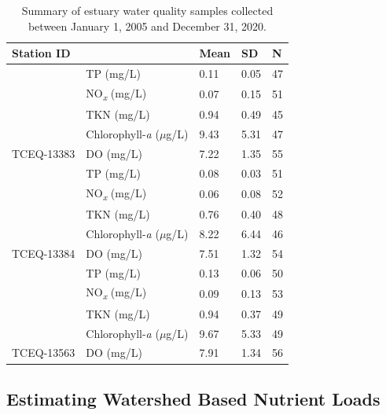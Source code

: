 \documentclass[water,article,submit,oneauthor]{Definitions/mdpi}
\begin{document}
\begin{table}[H]

\caption{\label{tab:estuarysummary}Summary of estuary water quality samples collected between January 1, 2005 and December 31, 2020.}
\centering
\begin{tabular}[t]{lllll}
\toprule
Station ID &   & Mean & SD & N\\
\midrule
 & TP (mg/L) & 0.11 & 0.05 & 47\\

 & NO\textsubscript{\emph{x}} (mg/L) & 0.07 & 0.15 & 51\\

 & TKN (mg/L) & 0.94 & 0.49 & 45\\

 & Chlorophyll-\emph{a} ($\mu$g/L) & 9.43 & 5.31 & 47\\

\multirow{-5}{*}{\raggedright\arraybackslash TCEQ-13383} & DO (mg/L) & 7.22 & 1.35 & 55\\
\cmidrule{1-5}
 & TP (mg/L) & 0.08 & 0.03 & 51\\

 & NO\textsubscript{\emph{x}} (mg/L) & 0.06 & 0.08 & 52\\

 & TKN (mg/L) & 0.76 & 0.40 & 48\\

 & Chlorophyll-\emph{a} ($\mu$g/L) & 8.22 & 6.44 & 46\\

\multirow{-5}{*}{\raggedright\arraybackslash TCEQ-13384} & DO (mg/L) & 7.51 & 1.32 & 54\\
\cmidrule{1-5}
 & TP (mg/L) & 0.13 & 0.06 & 50\\

 & NO\textsubscript{\emph{x}} (mg/L) & 0.09 & 0.13 & 53\\

 & TKN (mg/L) & 0.94 & 0.37 & 49\\

 & Chlorophyll-\emph{a} ($\mu$g/L) & 9.67 & 5.33 & 49\\

\multirow{-5}{*}{\raggedright\arraybackslash TCEQ-13563} & DO (mg/L) & 7.91 & 1.34 & 56\\
\bottomrule
\end{tabular}
\end{table}

\hypertarget{estimating-watershed-based-nutrient-loads}{%
\subsection{Estimating Watershed Based Nutrient
Loads}\label{estimating-watershed-based-nutrient-loads}}
\end{document}
